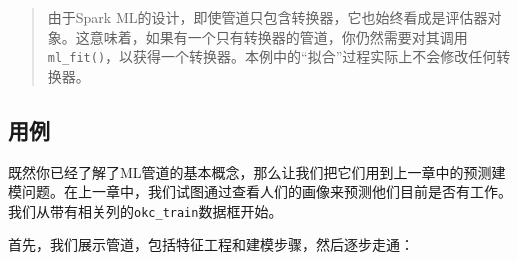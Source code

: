 \documentclass[
]{article}
\newenvironment{Shaded}{\begin{snugshade}}{\end{snugshade}}
\newcommand{\KeywordTok}[1]{\textcolor[rgb]{0.13,0.29,0.53}{\textbf{#1}}}
\newcommand{\NormalTok}[1]{#1}
\newcommand{\OperatorTok}[1]{\textcolor[rgb]{0.81,0.36,0.00}{\textbf{#1}}}
\newcommand{\StringTok}[1]{\textcolor[rgb]{0.31,0.60,0.02}{#1}}
\begin{document}
\begin{quote}
由于Spark
ML的设计，即使管道只包含转换器，它也始终看成是评估器对象。这意味着，如果有一个只有转换器的管道，你仍然需要对其调用\texttt{ml\_fit()}，以获得一个转换器。本例中的``拟合''过程实际上不会修改任何转换器。
\end{quote}

\hypertarget{ux7528ux4f8b}{%
\subsection{用例}\label{ux7528ux4f8b}}

既然你已经了解了ML管道的基本概念，那么让我们把它们用到上一章中的预测建模问题。在上一章中，我们试图通过查看人们的画像来预测他们目前是否有工作。我们从带有相关列的\texttt{okc\_train}数据框开始。

\begin{Shaded}
\end{Shaded}

首先，我们展示管道，包括特征工程和建模步骤，然后逐步走通：
\end{document}
